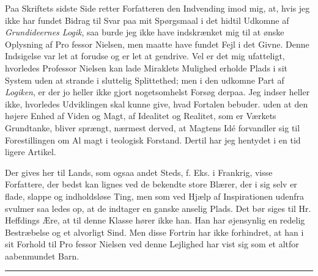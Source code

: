 \documentclass[12pt,a4paper,openany]{book}
\newcommand{\piecerule}{\par\begin{center}\rule{1.5cm}{0.4pt}\end{center}\par}
\newcommand{\opage}[1]{\marginnote{\footnotesize\textit{[#1]}}}
\begin{document}
Paa Skriftets sidste Side retter Forfatteren den Indvending
imod mig, at, hvis jeg ikke har fundet Bidrag til Svar paa mit
Spørgsmaal i det hidtil Udkomne af \emph{Grundideernes Logik}, saa burde
\opage{16}jeg ikke have indskrænket mig til at ønske Oplysning af Pro\-%
fessor Nielsen, men maatte have fundet Fejl i det Givne. Denne
Indsigelse var let at forudse og er let at gendrive. Vel er det
mig ufatteligt, hvorledes Professor Nielsen kan lade Miraklets
Mulighed erholde Plads i sit System uden at strande i sluttelig
Splittethed; men i den udkomne Part af \emph{Logiken}, er der jo heller
ikke gjort nogetsomhelst Forsøg derpaa. Jeg indser heller ikke,
hvorledes Udviklingen skal kunne give, hvad Fortalen bebuder.
uden at den højere Enhed af Viden og Magt, af Idealitet og
Realitet, som er Værkets Grundtanke, bliver sprængt, nærmest
derved, at Magtens Idé forvandler sig til Forestillingen om Al\-%
magt i teologisk Forstand. Dertil har jeg hentydet i en tid\-%
ligere Artikel.

Der gives her til Lands, som ogsaa andet Steds, f. Eks. i
Frankrig, visse Forfattere, der bedst kan lignes ved de bekendte
store Blærer, der i sig selv er flade, slappe og indholdsløse
Ting, men som ved Hjælp af Inspirationen udenfra svulmer saa\-%
ledes op, at de indtager en ganske anselig Plads. Det bør siges
til Hr. Heffdings Ære, at til denne Klasse hører ikke han. Han
har øjensynlig en redelig Bestræbelse og et alvorligt Sind. Men
disse Fortrin har ikke forhindret, at han i sit Forhold til Pro\-%
fessor Nielsen ved denne Lejlighed har vist sig som et altfor
aabenmundet Barn.
\piecerule
\end{document}
